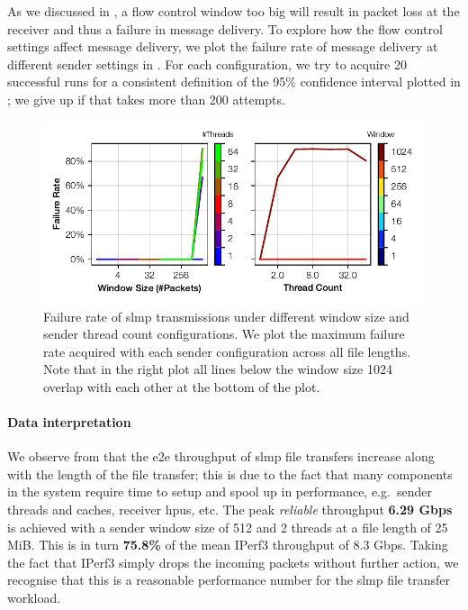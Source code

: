 As we discussed in , a flow control window too big will result in packet loss at the receiver and thus a failure in message delivery.  To explore how the flow control settings affect message delivery, we plot the failure rate of message delivery at different sender settings in .  For each configuration, we try to acquire 20 successful runs for a consistent definition of the 95\% confidence interval plotted in ; we give up if that takes more than 200 attempts.

\begin{figure}[t]
    \centering
    \includegraphics{figures/slmp-loss.pdf}
    \caption{Failure rate of \ac{slmp} transmissions under different window size and sender thread count configurations.  We plot the maximum failure rate acquired with each sender configuration across all file lengths.  Note that in the right plot all lines below the window size 1024 overlap with each other at the bottom of the plot.} \label{fig:slmp-loss}
\end{figure}

\paragraph{Data interpretation} We observe from  that the \ac{e2e} throughput of \ac{slmp} file transfers increase along with the length of the file transfer; this is due to the fact that many components in the system require time to setup and spool up in performance, e.g.\ sender threads and caches, receiver \ac{hpu}s, etc.  The peak \emph{reliable} throughput \textbf{6.29 Gbps} is achieved with a sender window size of 512 and 2 threads at a file length of 25 MiB.  This is in turn \textbf{75.8\%} of the mean IPerf3 throughput of 8.3 Gbps.  Taking the fact that IPerf3 simply drops the incoming packets without further action, we recognise that this is a reasonable performance number for the \ac{slmp} file transfer workload.

